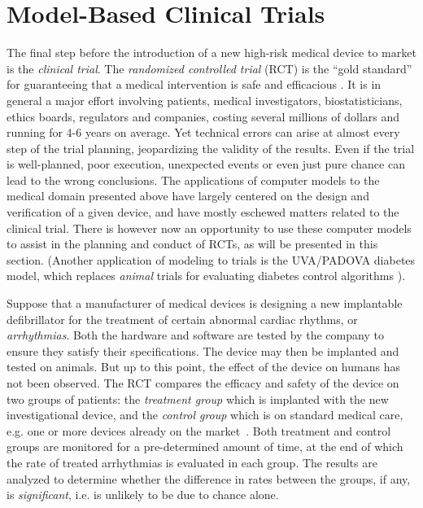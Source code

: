\section{Model-Based Clinical Trials}
The final step before the introduction of a new high-risk medical device to market is the \emph{clinical trial}.
The \emph{randomized controlled trial} (RCT) is the ``gold standard'' for guaranteeing that a medical intervention is safe and efficacious \cite{FriedmanFD10_ClinicalTrials}.
It is in general a major effort involving patients, medical investigators, biostatisticians, ethics boards,  regulators and companies, costing several millions of dollars and running for 4-6 years on average.
Yet technical errors can arise at almost every step of the trial planning, jeopardizing the validity of the results. 
Even if the trial is well-planned, poor execution, unexpected events or even just pure chance can lead to the wrong conclusions.
The applications of computer models to the medical domain presented above have largely centered on the design and verification of a given device, and have mostly eschewed matters related to the clinical trial.
There is however now an opportunity to use these computer models to assist in the planning and conduct of RCTs, as will be presented in this section.
(Another application of modeling to trials is the UVA/PADOVA diabetes model, which replaces \emph{animal} trials for evaluating diabetes control algorithms \cite{pancreas_paul}). 

Suppose that a manufacturer of medical devices is designing a new implantable defibrillator for the treatment of certain abnormal cardiac rhythms, or \emph{arrhythmias}.  
Both the hardware and software are tested by the company to ensure they satisfy their specifications.
The device may then be implanted and tested on animals. 
But up to this point, the effect of the device on humans has not been observed. 
The RCT compares the efficacy and safety of the device on two groups of patients: the \emph{treatment group} which is implanted with the new investigational device, and the \emph{control group} which is on standard medical care, e.g. one or more devices already on the market~\cite{FriedmanFD10_ClinicalTrials}.
Both treatment and control groups are monitored for a pre-determined amount of time, at the end of which the rate of treated arrhythmias is evaluated in each group. The results are analyzed to determine whether the difference in rates between the groups, if any, is \emph{significant}, i.e. is unlikely to be due to chance alone.

